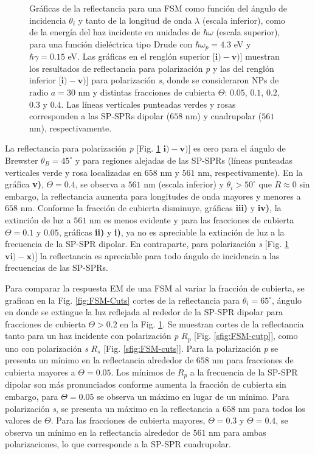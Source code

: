 \begin{figure}[h!]
\begin{tikzpicture}
\end{tikzpicture}\vspace*{-.5em}
	\caption{Gráficas de la reflectancia para una FSM como función del ángulo de incidencia $\theta_i$ y tanto de la longitud de onda $\lambda$ (escala inferior), como de la energía del haz incidente en unidades de $\hbar\omega$ (escala superior), para una función dieléctrica tipo Drude con $\hbar\omega_p=4. 3$ eV  y  $\hbar\gamma=0. 15$ eV.  Las gráficas   en el renglón superior [$\mathbf{i)-v)}$]  muestran los resultados de reflectancia para  polarización \emph{p} y las del renglón inferior  [$\mathbf{i)-v)}$] para polarización  \emph{s}, donde se consideraron NPs de radio $a=30$ nm y distintas fracciones de cubierta $\Theta$: $0. 05$, $0. 1$, $0. 2$, $0. 3$ y $0. 4$. Las líneas verticales punteadas verdes y rosas corresponden a las SP-SPRs dipolar ($658$ nm) y cuadrupolar ($561$ nm), respectivamente.}	\label{fig:R-FSM}	
	\end{figure}		
					
La reflectancia para polarización \emph{p} [Fig. \ref{fig:R-FSM} $\mathbf{i)-v)}$] es cero para el ángulo de Brewster $\theta_B = 45^\circ$ y para regiones alejadas de las SP-SPRs (líneas punteadas verticales verde y rosa  localizadas en $658$ nm y $561$ nm, respectivamente). En la gráfica \textbf{v)}, $\Theta=0.4$,  se observa a $561$ nm (escala inferior) y $\theta_i>50^\circ$ que $R\approx 0$ sin embargo, la reflectancia aumenta para longitudes de onda mayores y menores a $658$ nm. Conforme la fracción de cubierta disminuye, gráficas \textbf{iii)} y \textbf{iv)}, la extinción de luz a $561$ nm  es menos evidente y para las fracciones de cubierta $\Theta=0.1$ y $0.05$, gráficas \textbf{ii)} y \textbf{i)}, ya no es apreciable la extinción de luz a la frecuencia de la SP-SPR dipolar. En contraparte, para polarización \emph{s} [Fig. \ref{fig:R-FSM} $\mathbf{vi)-x)}$] la reflectancia es apreciable para todo ángulo de incidencia a las frecuencias de las SP-SPRs. 

Para comparar la respuesta EM  de una FSM al variar la fracción de cubierta, se grafican en la  Fig. \ref{fig:FSM-Cuts} cortes de la reflectancia para $\theta_i = 65^\circ$, ángulo en donde se extingue la luz reflejada al rededor de la SP-SPR dipolar para fracciones de cubierta $\Theta>0.2$ en la Fig. \ref{fig:R-FSM}. Se muestran cortes de la reflectancia tanto para un haz incidente con polarización \emph{p} $R_p$ [Fig. \ref{sfig:FSM-cutp}], como uno con polarización \emph{s} $R_s$ [Fig. \ref{sfig:FSM-cuts}]. Para la polarización \emph{p} se presenta un mínimo en la reflectancia alrededor de $658$ nm para fracciones de cubierta mayores a $\Theta = 0.05$. Los mínimos de $R_p$ a la frecuencia de la SP-SPR dipolar son más pronunciados conforme aumenta la fracción de cubierta sin embargo, para $\Theta=0.05$ se observa un máximo en lugar de un mínimo. Para polarización \emph{s}, se presenta un máximo en la reflectancia a $658$ nm para todos los valores de $\Theta$. Para las fracciones de cubierta mayores, $\Theta = 0.3$ y $\Theta = 0.4$,  se observa un  mínimo en la reflectancia alrededor de $561$ nm para ambas polarizaciones, lo que corresponde a la SP-SPR cuadrupolar.

